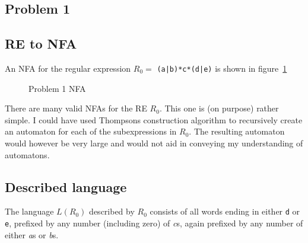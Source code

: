 \documentclass[twoside]{article}
\begin{document}
\begin{multicols}{2} %

\section{Problem 1}
\subsection{RE to NFA}

An NFA for the regular expression $R_0 = $ \texttt{(a|b)*c*(d|e)} is shown in figure~\ref{fig:prob1}

\begin{figure}[H]
\centering
{}
\caption{Problem 1 NFA} \label{fig:prob1}
\end{figure}

There are many valid NFAs for the RE $R_0$.
This one is (on purpose) rather simple. I could have used Thompsons construction algorithm to recursively create an automaton for each of the subexpressions in $R_0$.
The resulting automaton would however be very large and would not aid in conveying my understanding of automatons.

\subsection{Described language}

The language $L(R_0)$ described by $R_0$ consists of all words ending in either \texttt{d} or \texttt{e}, prefixed by any number (including zero) of \textit{c}s, again prefixed by any number of either \textit{a}s or \textit{b}s.


\end{multicols}
\end{document}
